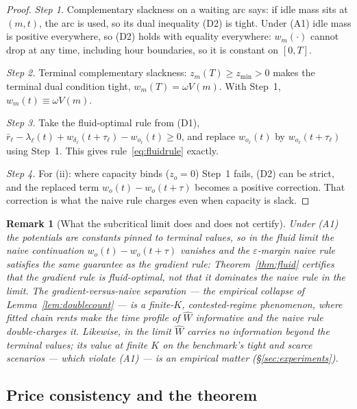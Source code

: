 \documentclass[11pt]{article}
\newtheorem{remark}{Remark}
\begin{document}
\begin{proof}
\emph{Step 1.} Complementary slackness on a waiting arc says: if idle
mass sits at $(m, t)$, the arc is used, so its dual inequality (D2) is
tight. Under (A1) idle mass is positive everywhere, so (D2) holds with
equality everywhere: $w_m(\cdot)$ cannot drop at any time, including
hour boundaries, so it is constant on $[0, T]$.

\emph{Step 2.} Terminal complementary slackness: $z_m(T) \geq
z_{\min} > 0$ makes the terminal dual condition tight,
$w_m(T) = \omega V(m)$. With Step~1, $w_m(t) \equiv \omega V(m)$.

\emph{Step 3.} Take the fluid-optimal rule from (D1),
$\bar{r}_{\ell} - \lambda_{\ell}(t) + w_{\delta_{\ell}}(t+\tau_{\ell})
- w_{o_{\ell}}(t) \geq 0$, and replace $w_{o_{\ell}}(t)$ by
$w_{o_{\ell}}(t + \tau_{\ell})$ using Step~1. This gives
rule~\eqref{eq:fluidrule} exactly.

\emph{Step 4.} For (ii): where capacity binds ($z_o = 0$) Step~1
fails, (D2) can be strict, and the replaced term
$w_o(t) - w_o(t+\tau)$ becomes a positive correction. That correction
is what the naive rule charges even when capacity is slack.
\end{proof}

\begin{remark}[What the subcritical limit does and does not certify]
\label{rem:honest}
Under (A1) the potentials are constants pinned to terminal values, so
in the fluid \emph{limit} the naive continuation $w_o(t) - w_o(t+\tau)$
vanishes and the $\varepsilon$-margin naive rule satisfies the same
guarantee as the gradient rule: Theorem~\ref{thm:fluid} certifies that
the gradient rule is fluid-optimal, not that it dominates the naive
rule in the limit. The gradient-versus-naive separation --- the
empirical collapse of Lemma~\ref{lem:doublecount} --- is a
finite-$K$, contested-regime phenomenon, where fitted chain rents make
the time profile of $\widehat{W}$ informative and the naive rule
double-charges it. Likewise, in the limit $\widehat{W}$ carries no
information beyond the terminal values; its value at finite $K$ on the
benchmark's tight and scarce scenarios --- which violate (A1) --- is an
empirical matter (\S\ref{sec:experiments}).
\end{remark}

\subsection{Price consistency and the theorem}
\end{document}
